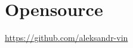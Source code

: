\section*{Opensource}

\href{https://github.com/aleksandr-vin}{\url{https://github.com/aleksandr-vin}}
